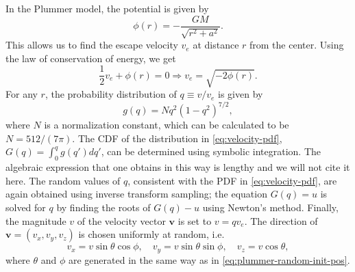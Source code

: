 In the Plummer model, the potential is given by
\begin{equation*}
    \phi(r) = -\frac{GM}{\sqrt{r^2 + a^2}}.
\end{equation*}
This allows us to find the escape velocity $v_e$ at distance $r$ from the center.
Using the law of conservation of energy, we get
\begin{equation*}
    \frac{1}{2}v_e + \phi(r) = 0 \Rightarrow v_e = \sqrt{-2\phi(r)}.
\end{equation*}
For any $r$, the probability distribution of $q \equiv v/v_e$ is given by \cite{Aarseth1974Comparison}
\begin{equation}\label{eq:velocity-pdf}
    g(q) = N q^2(1-q^2)^{7/2},
\end{equation}
where $N$ is a normalization constant, which can be calculated to be $N = 512 / (7\pi)$.
The CDF of the distribution in \autoref{eq:velocity-pdf}, $G(q) = \int_0^q g(q') dq'$, can be determined using symbolic integration.
The algebraic expression that one obtains in this way is lengthy and we will not cite it here.
The random values of $q$, consistent with the PDF in \autoref{eq:velocity-pdf}, are again obtained using inverse transform sampling;
the equation $G(q) = u$ is solved for $q$ by finding the roots of $G(q) - u$ using Newton's method.
Finally, the magnitude $v$ of the velocity vector $\mathbf{v}$ is set to $v = qv_e$.
The direction of $\mathbf{v} = (v_x, v_y, v_z)$ is chosen uniformly at random, i.e.
\begin{equation*}
    v_x = v\sin\theta \cos\phi, \quad v_y = v\sin\theta\sin\phi, \quad v_z = v\cos\theta,
\end{equation*}
where $\theta$ and $\phi$ are generated in the same way as in \autoref{eq:plummer-random-init-pos}.

